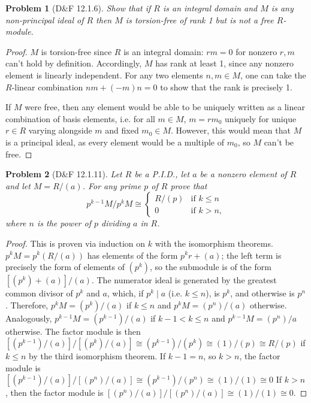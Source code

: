 \documentclass{article}
\newtheorem{plm}{Problem}
\begin{document}
\begin{plm}[D\&F 12.1.6]
  Show that if $R$ is an integral domain and $M$ is any non-principal ideal of $R$ then $M$ is torsion-free of rank 1 but is not a free $R$-module.
\end{plm}

\begin{proof}
  $M$ is torsion-free since $R$ is an integral domain: $rm = 0$ for nonzero $r, m$ can't hold by definition.
  Accordingly, $M$ has rank at least 1, since any nonzero element is linearly independent.
  For any two elements $n, m \in M$, one can take the $R$-linear combination $nm + (-m)n = 0$ to show that the rank is precisely 1.

  If $M$ were free, then any element would be able to be uniquely written as a linear combination of basis elements,
  i.e. for all $m \in M$, $m = rm_{0}$ uniquely for unique $r \in R$ varying alongside $m$ and fixed $m_{0} \in M$.
  However, this would mean that $M$ is a principal ideal, as every element would be a multiple of $m_{0}$, so $M$ can't be free.
\end{proof}

\begin{plm}[D\&F 12.1.11]
  Let $R$ be a P.I.D., let $a$ be a nonzero element of $R$ and let $M = R / (a)$.
  For any prime $p$ of $R$ prove that
  \[
    p^{k-1}M / p^{k}M \cong
    \begin{cases}
      R / (p) & \text{if } k \leq n \\
      0 & \text{if } k > n,
    \end{cases}
  \]
  where $n$ is the power of $p$ dividing $a$ in $R$.
\end{plm}

\begin{proof}
  This is proven via induction on $k$ with the isomorphism theorems.
  $p^{k}M = p^{k}(R / (a))$ has elements of the form $p^{k}r + (a)$; the left term is precisely the form of elements of $(p^{k})$,
  so the submodule is of the form $[(p^{k}) + (a)] / (a)$.
  The numerator ideal is generated by the greatest common divisor of $p^{k}$ and $a$, which, if $p^{k} \mid a$ (i.e. $k \leq n$), is $p^{k}$,
  and otherwise is $p^{n}$.
  Therefore, $p^{k}M = (p^{k}) / (a)$ if $k \leq n$ and $p^{k}M = (p^{n}) / (a)$ otherwise.
  Analogously, $p^{k-1}M = (p^{k-1}) / (a)$ if $k-1 < k \leq n$ and $p^{k-1}M = (p^{n}) / a$ otherwise.
  The factor module is then $[(p^{k-1}) / (a)] / [(p^{k}) / (a)] \cong (p^{k-1}) / (p^{k}) \cong (1) / (p) \cong R / (p)$ if $k \leq n$
  by the third isomorphism theorem.
  If $k - 1 = n$, so $k > n$, the factor module is $[(p^{k-1}) / (a)] / [(p^{n}) / (a)] \cong (p^{k-1}) / (p^{n}) \cong (1) / (1) \cong 0$
  If $k > n$, then the factor module is $[(p^{n}) / (a)] / [(p^{n}) / (a)] \cong (1) / (1) \cong 0$.
\end{proof}
\end{document}
